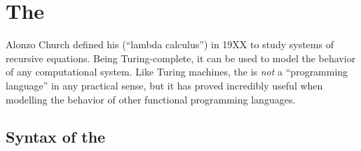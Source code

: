 \documentclass[12pt]{report}
\begin{document}


\section{The \LamA}
\label{lang_sec1}


Alonzo Church defined his \lamA (``lambda calculus'') in 19XX
\citep{ChurchXX} to study systems of recursive equations. Being
Turing-complete, it can be used to model the behavior of any
computational system. Like Turing machines, the \lamA is \emph{not}
a ``programming language'' in any practical sense, but it has proved
incredibly useful when modelling the behavior of other functional
programming languages.

\subsection{Syntax of the \LamA}
\label{lang_sec1_syntax}
\end{document}
